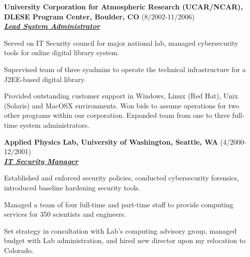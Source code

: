 \documentclass{article}
\newcommand{\employer}[3]{{ \textbf{#1} (#2)\\ \underline{\textbf{\emph{#3}}}\\ \nopagebreak }}
\newenvironment{achievements}{\begin{list}{\topsep 0pt \itemsep -2pt}} {\vspace*{4pt}\end{list}}
\begin{document}
\employer{University Corporation for Atmospheric Research (UCAR/NCAR), DLESE Program Center, Boulder, CO}{8/2002-11/2006}{Lead System Administrator}
\begin{achievements}
    \item Served on IT Security council for major national lab, managed cybersecurity tools for online digital library system.
    \item Supervised team of three syadmins to operate the technical infrastructure for a J2EE-based digital library.
    \item Provided outstanding customer support in Windows, Linux (Red Hat), Unix (Solaris) and MacOSX environments. Won bids to assume operations for two other programs within our corporation. Expanded team from one to three full-time system administrators.
\end{achievements}


\employer{Applied Physics Lab, University of Washington, Seattle, WA}{4/2000-12/2001}{IT Security Manager}
\begin{achievements}
    \item Established and enforced security policies, conducted cybersecurity forensics, introduced baseline hardening security tools.
    \item Managed a team of four full-time and part-time staff to provide computing services for 350 scientists and engineers.
    \item Set strategy in consultation with Lab's computing advisory group, managed budget with Lab administration, and hired new director upon my relocation to Colorado.

\end{achievements}
\end{document}
